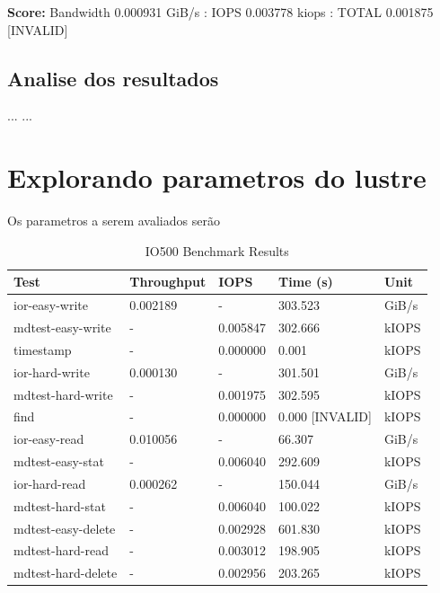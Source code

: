 \documentclass[article,a4paper,12pt,brazil,sumario=tradicional]{abntex2}
\begin{document}
\textbf{Score:} Bandwidth 0.000931 GiB/s : IOPS 0.003778 kiops : TOTAL 0.001875 [INVALID]
\subsection{Analise dos resultados}
...
...
\section{Explorando parametros do lustre}
Os parametros a serem avaliados serão 
\begin{table}[htb]
	\centering
	\begin{tabular}{|l|l|l|l|l|}
		\hline
		\rowcolor[HTML]{EFEFEF}
		\textbf{Test}          & \textbf{Throughput}        & \textbf{IOPS}         & \textbf{Time (s)} & \textbf{Unit} \\ \hline
		ior-easy-write         & 0.002189                    & -                    & 303.523           & GiB/s         \\ \hline
		mdtest-easy-write      & -                          & 0.005847             & 302.666           & kIOPS         \\ \hline
		timestamp              & -                          & 0.000000             & 0.001             & kIOPS         \\ \hline
		ior-hard-write         & 0.000130                    & -                    & 301.501           & GiB/s         \\ \hline
		mdtest-hard-write      & -                          & 0.001975             & 302.595           & kIOPS         \\ \hline
		find                   & -                          & 0.000000             & 0.000 [INVALID]   & kIOPS         \\ \hline
		ior-easy-read          & 0.010056                    & -                    & 66.307            & GiB/s         \\ \hline
		mdtest-easy-stat       & -                          & 0.006040             & 292.609           & kIOPS         \\ \hline
		ior-hard-read          & 0.000262                    & -                    & 150.044           & GiB/s         \\ \hline
		mdtest-hard-stat       & -                          & 0.006040             & 100.022           & kIOPS         \\ \hline
		mdtest-easy-delete     & -                          & 0.002928             & 601.830           & kIOPS         \\ \hline
		mdtest-hard-read       & -                          & 0.003012             & 198.905           & kIOPS         \\ \hline
		mdtest-hard-delete     & -                          & 0.002956             & 203.265           & kIOPS         \\ \hline
	\end{tabular}
	\caption{IO500 Benchmark Results}
	\label{tab:io500-results}
\end{table}
\end{document}
